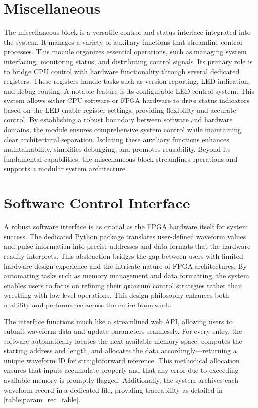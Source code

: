 \section{Miscellaneous}

The miscellaneous block is a versatile control and status interface integrated into the system. It manages a variety of auxiliary functions that streamline control processes. This module organizes essential operations, such as managing system interfacing, monitoring status, and distributing control signals. Its primary role is to bridge CPU control with hardware functionality through several dedicated registers. These registers handle tasks such as version reporting, LED indication, and debug routing. A notable feature is its configurable LED control system. This system allows either CPU software or FPGA hardware to drive status indicators based on the LED enable register settings, providing flexibility and accurate control. By establishing a robust boundary between software and hardware domains, the module ensures comprehensive system control while maintaining clear architectural separation. Isolating these auxiliary functions enhances maintainability, simplifies debugging, and promotes reusability. Beyond its fundamental capabilities, the miscellaneous block streamlines operations and supports a modular system architecture.

\section{Software Control Interface}

A robust software interface is as crucial as the FPGA hardware itself for system success. The dedicated Python package translates user-defined waveform values and pulse information into precise addresses and data formats that the hardware readily interprets. This abstraction bridges the gap between users with limited hardware design experience and the intricate nature of FPGA architectures. By automating tasks such as memory management and data formatting, the system enables users to focus on refining their quantum control strategies rather than wrestling with low-level operations. This design philosophy enhances both usability and performance across the entire framework.

The interface functions much like a streamlined web API, allowing users to submit waveform data and update parameters seamlessly. For every entry, the software automatically locates the next available memory space, computes the starting address and length, and allocates the data accordingly—returning a unique waveform ID for straightforward reference. This methodical allocation ensures that inputs accumulate properly and that any error due to exceeding available memory is promptly flagged. Additionally, the system archives each waveform record in a dedicated file, providing traceability as detailed in \autoref{table:param_rec_table}.

